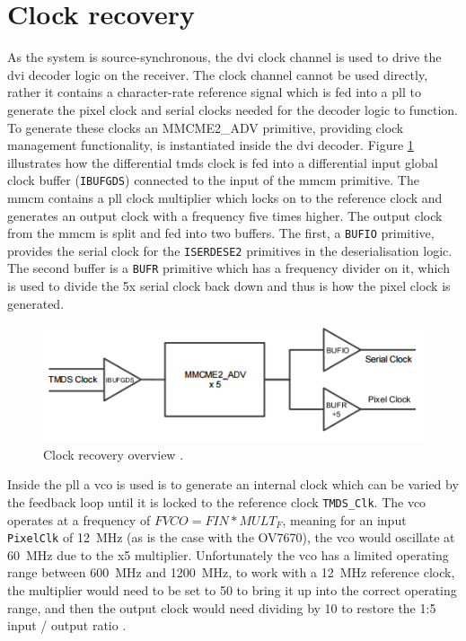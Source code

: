 \section{Clock recovery}
As the system is source-synchronous, the \gls{dvi} clock channel is used to drive the \gls{dvi} decoder logic on the receiver. The clock channel cannot be used directly, rather it contains a character-rate reference signal which is fed into a \gls{pll} to generate the pixel clock and serial clocks needed for the decoder logic to function. To generate these clocks an MMCME2\_ADV primitive, providing clock management functionality, is instantiated inside the \gls{dvi} decoder. Figure \ref{fig:clock_recovery} illustrates how the differential \gls{tmds} clock is fed into a differential input global clock buffer (\texttt{IBUFGDS}) connected to the input of the \gls{mmcm} primitive. The \gls{mmcm} contains a \gls{pll} clock multiplier which locks on to the reference clock and generates an output clock with a frequency five times higher. The output clock from the \gls{mmcm} is split and fed into two buffers. The first, a \texttt{BUFIO} primitive, provides the serial clock for the \texttt{ISERDESE2} primitives in the deserialisation logic. The second buffer is a \texttt{BUFR} primitive which has a frequency divider on it, which is used to divide the 5x serial clock back down and thus is how the pixel clock is generated. 

\begin{figure}
  \centering
  \includegraphics[width=1\textwidth]{./img/clock_recovery.png}
  \caption{Clock recovery overview \cite{dvi2rgb}.}
  \label{fig:clock_recovery}
\end{figure}

Inside the \gls{pll} a \gls{vco} is used is to generate an internal clock which can be varied by the feedback loop until it is locked to the reference clock \texttt{TMDS\_Clk}. The \gls{vco} operates at a frequency of \(FVCO = FIN * MULT_F\), meaning for an input \texttt{PixelClk} of \SI{12}{\mega\hertz} (as is the case with the OV7670), the \gls{vco} would oscillate at \SI{60}{\mega\hertz} due to the x5 multiplier. Unfortunately the \gls{vco} has a limited operating range between \SI{600}{\mega\hertz} and \SI{1200}{\mega\hertz}, to work with a \SI{12}{\mega\hertz} reference clock, the multiplier would need to be set to 50 to bring it up into the correct operating range, and then the output clock would need dividing by 10 to restore the 1:5 input / output ratio \cite{xilinx:ds187}.

